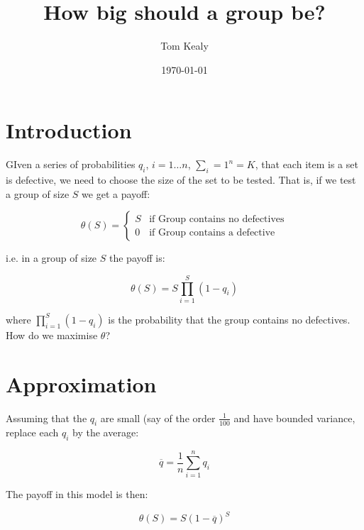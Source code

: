 \documentclass[11pt]{article}
\theoremstyle{remark}
\numberwithin{equation}{section}
\newcommand{\twopartdef}[4]
{
	\left\{
		\begin{array}{ll}
			#1 & \mbox{if } #2 \\
			#3 & \mbox{if } #4
		\end{array}
	\right.
}
\begin{document}
\title{How big should a group be?}
\author{Tom Kealy}

\date{\today}


\maketitle

\section{Introduction}

GIven a series of probabilities \(q_i\), \(i=1\ldots n\),  \(\sum_i=1^n = K\), that each item is a set is defective, we need to choose the size of the set to be tested. That is, if we test a group of size \(S\) we get a payoff:

\begin{equation}
\theta\left(S\right) = \twopartdef {S} {\text{Group contains no defectives}} {0} {\text{Group contains a defective}}
\end{equation}

i.e. in a group of size \(S\) the payoff is: 

\begin{equation}
\theta\left(S\right) = S \prod_{i=1}^S (1-q_i)
\end{equation}

where \(\prod_{i=1}^S(1-q_i)\) is the probability that the group contains no defectives. How do we maximise \(\theta\)?

\section{Approximation}
Assuming that the \(q_i\) are small (say of the order \(\frac{1}{100}\) and have bounded variance, replace each \(q_i\) by the average: 

\begin{equation}
\overline{q} = \frac{1}{n} \sum_{i=1}^n q_i
\end{equation}

The payoff in this model is then: 

\begin{equation}
\theta\left(S\right) = S (1-\overline{q})^S
\end{equation}
\end{document}
